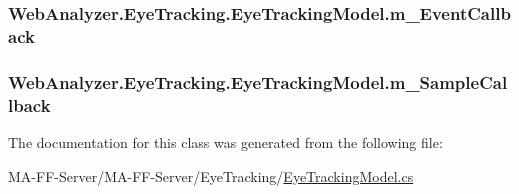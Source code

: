 \subsubsection[{m\+\_\+\+Event\+Callback}]{ Web\+Analyzer.\+Eye\+Tracking.\+Eye\+Tracking\+Model.\+m\+\_\+\+Event\+Callback\hspace{0.3cm}{\ttfamily [private]}}\label{class_web_analyzer_1_1_eye_tracking_1_1_eye_tracking_model_a806e6c2c97d1e27187755e8d22f87d86}
\hypertarget{class_web_analyzer_1_1_eye_tracking_1_1_eye_tracking_model_a968cb8269069b117054c23c913671380}{}
\subsubsection[{m\+\_\+\+Sample\+Callback}]{ Web\+Analyzer.\+Eye\+Tracking.\+Eye\+Tracking\+Model.\+m\+\_\+\+Sample\+Callback\hspace{0.3cm}{\ttfamily [private]}}\label{class_web_analyzer_1_1_eye_tracking_1_1_eye_tracking_model_a968cb8269069b117054c23c913671380}


The documentation for this class was generated from the following file\+:\begin{DoxyCompactItemize}
\item 
M\+A-\/\+F\+F-\/\+Server/\+M\+A-\/\+F\+F-\/\+Server/\+Eye\+Tracking/\hyperlink{_eye_tracking_model_8cs}{Eye\+Tracking\+Model.\+cs}\end{DoxyCompactItemize}
